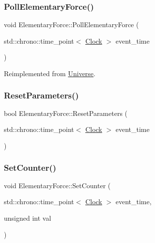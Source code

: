 \subsubsection{\texorpdfstring{Poll\+Elementary\+Force()}{PollElementaryForce()}}
{\footnotesize\ttfamily void Elementary\+Force\+::\+Poll\+Elementary\+Force (\begin{DoxyParamCaption}\item[{std\+::chrono\+::time\+\_\+point$<$ \mbox{\hyperlink{universe_8h_a0ef8d951d1ca5ab3cfaf7ab4c7a6fd80}{Clock}} $>$}]{event\+\_\+time }\end{DoxyParamCaption})\hspace{0.3cm}{\ttfamily [virtual]}}



Reimplemented from \mbox{\hyperlink{classUniverse_a0c485c504542409cbb5cfd8543c35b11}{Universe}}.

\mbox{\label{classElementaryForce_a1dedcd23a538b87f71ecd43cb36a6db5}} 
\subsubsection{\texorpdfstring{Reset\+Parameters()}{ResetParameters()}}
{\footnotesize\ttfamily bool Elementary\+Force\+::\+Reset\+Parameters (\begin{DoxyParamCaption}\item[{std\+::chrono\+::time\+\_\+point$<$ \mbox{\hyperlink{universe_8h_a0ef8d951d1ca5ab3cfaf7ab4c7a6fd80}{Clock}} $>$}]{event\+\_\+time }\end{DoxyParamCaption})}

\mbox{\label{classElementaryForce_a3762cf66ed266b310446417215dec3fa}} 
\subsubsection{\texorpdfstring{Set\+Counter()}{SetCounter()}}
{\footnotesize\ttfamily void Elementary\+Force\+::\+Set\+Counter (\begin{DoxyParamCaption}\item[{std\+::chrono\+::time\+\_\+point$<$ \mbox{\hyperlink{universe_8h_a0ef8d951d1ca5ab3cfaf7ab4c7a6fd80}{Clock}} $>$}]{event\+\_\+time,  }\item[{unsigned int}]{val }\end{DoxyParamCaption})\hspace{0.3cm}{\ttfamily [virtual]}}



